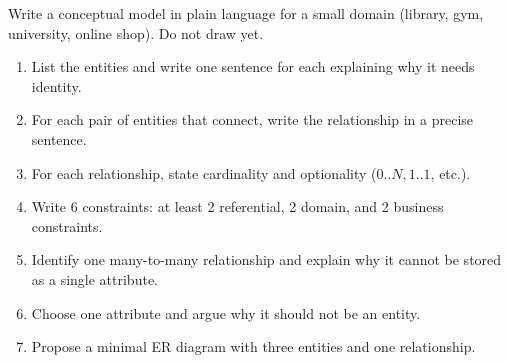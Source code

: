 \begin{exercisebox}
Write a conceptual model in plain language for a small domain (library, gym, university, online shop).
Do not draw yet.
\begin{enumerate}[label=\arabic*.]
  \item List the entities and write one sentence for each explaining why it needs identity.
  \item For each pair of entities that connect, write the relationship in a precise sentence.
  \item For each relationship, state cardinality and optionality (\(0..N, 1..1\), etc.).
  \item Write 6 constraints: at least 2 referential, 2 domain, and 2 business constraints.
  \item Identify one many-to-many relationship and explain why it cannot be stored as a single attribute.
  \item Choose one attribute and argue why it should not be an entity.
  \item Propose a minimal ER diagram with three entities and one relationship.
\end{enumerate}
\end{exercisebox}
